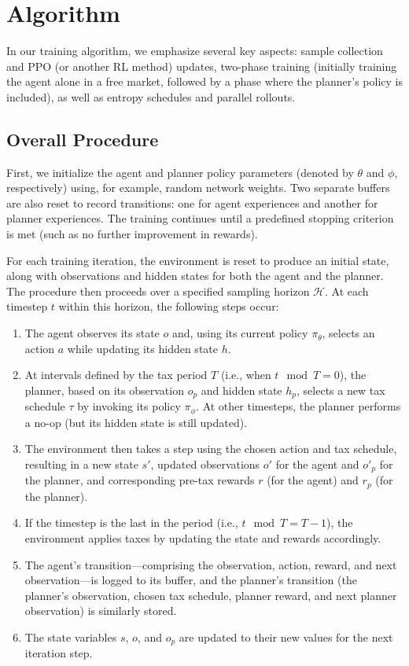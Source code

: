 \section{Algorithm}
\label{sec:algorithm}

In our training algorithm, we emphasize several key aspects: sample collection and PPO (or another RL method) updates, two-phase training (initially training the agent alone in a free market, followed by a phase where the planner’s policy is included), as well as entropy schedules and parallel rollouts.

\subsection{Overall Procedure}

First, we initialize the agent and planner policy parameters (denoted by \(\theta\) and \(\phi\), respectively) using, for example, random network weights. Two separate buffers are also reset to record transitions: one for agent experiences and another for planner experiences. The training continues until a predefined stopping criterion is met (such as no further improvement in rewards).

For each training iteration, the environment is reset to produce an initial state, along with observations and hidden states for both the agent and the planner. The procedure then proceeds over a specified sampling horizon \(\mathcal{H}\). At each timestep \(t\) within this horizon, the following steps occur:

\begin{enumerate}[label=\textbf{Step \arabic*:}, leftmargin=2cm]
    \item The agent observes its state \(o\) and, using its current policy \(\pi_\theta\), selects an action \(a\) while updating its hidden state \(h\).
    \item At intervals defined by the tax period \(T\) (i.e., when \(t \mod T = 0\)), the planner, based on its observation \(o_p\) and hidden state \(h_p\), selects a new tax schedule \(\tau\) by invoking its policy \(\pi_\phi\). At other timesteps, the planner performs a no-op (but its hidden state is still updated).
    \item The environment then takes a step using the chosen action and tax schedule, resulting in a new state \(s'\), updated observations \(o'\) for the agent and \(o'_p\) for the planner, and corresponding pre-tax rewards \(r\) (for the agent) and \(r_p\) (for the planner).
    \item If the timestep is the last in the period (i.e., \(t \mod T = T-1\)), the environment applies taxes by updating the state and rewards accordingly.
    \item The agent’s transition—comprising the observation, action, reward, and next observation—is logged to its buffer, and the planner’s transition (the planner’s observation, chosen tax schedule, planner reward, and next planner observation) is similarly stored.
    \item The state variables \(s\), \(o\), and \(o_p\) are updated to their new values for the next iteration step.
\end{enumerate}

